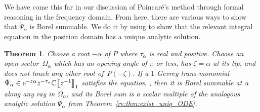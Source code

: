 \documentclass[pdftex]{sigma}
\newcommand{\C}{\mathbb{C}}
\newcommand{\series}[1]{\tilde{#1}}
\numberwithin{equation}{section}
\newtheorem{Theorem}{Theorem}[section]
\begin{document}
We have come this far in our discussion of Poincar\'e's method through formal reasoning in the frequency domain. From here, there are various ways to show that $\series{\Psi}_\alpha$ is Borel summable. We do it by using \cite[Theorem~4.6]{reg-sing-volterra} to show that the relevant integral equation in the position domain has a unique analytic solution.
\begin{Theorem}\label{thm:summability_ODE}
Choose a root $-\alpha$ of $P$ where $\tau_\alpha$ is real and positive. Choose an open sector~$\Omega_\alpha$ which has an opening angle of $\pi$ or less, has $\zeta = \alpha$ at its tip, and does not touch any other root of~$P(-\zeta)$. If a $1$-Gevrey trans-monomial $\series{\Psi}_\alpha \in {\rm e}^{-z\alpha} z^{-\tau_\alpha}\C\big\llbracket z^{-1} \big\rrbracket_1$ satisfies the equation~\smash{$\mathcal{P} \series{\Psi}_\alpha = 0$}, then it is Borel summable at $\alpha$ along any ray in $\Omega_\alpha$, and its Borel sum is a scalar multiple of the analogous analytic solution $\Psi_\alpha$ from Theorem~{\rm\ref{re:thm:exist_uniq_ODE}}.
\end{Theorem}
\end{document}

